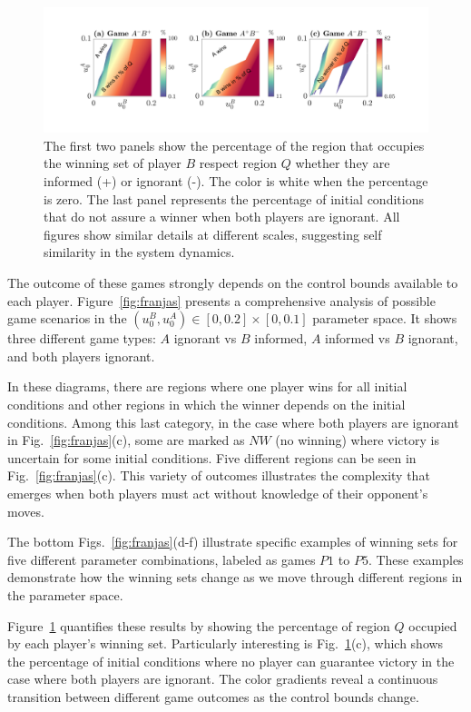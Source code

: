 \begin{figure}
    \centering
    \includegraphics[trim={3.1cm 0cm 0cm 0cm}, clip,width=1.12\textwidth  ]{Images/P5/fraccion.png}
    \caption{The first two panels show the percentage of the region that occupies the winning set of player $B$ respect region $Q$ whether they are informed (+) or ignorant (-). The color is white when the percentage is zero. The last panel represents the percentage of initial conditions that do not assure a winner when both players are ignorant. All figures show similar details at different scales, suggesting self similarity in the system dynamics.}
    \label{fig:fraccion}
\end{figure}

The outcome of these games strongly depends on the control bounds available to each player. Figure~\ref{fig:franjas} presents a comprehensive analysis of possible game scenarios in the $(u_0^B,u_0^A) \in [0,0.2]\times[0,0.1]$ parameter space. It shows three different game types: $A$ ignorant vs $B$ informed, $A$ informed vs $B$ ignorant, and both players ignorant.

In these diagrams, there are regions where one player wins for all initial conditions and other regions in which the winner depends on the initial conditions. Among this last category, in the case where both players are ignorant in Fig.~\ref{fig:franjas}(c), some are marked as $NW$ (no winning) where victory is uncertain for some initial conditions. Five different regions can be seen in Fig.~\ref{fig:franjas}(c). This variety of outcomes illustrates the complexity that emerges when both players must act without knowledge of their opponent's moves.

The bottom Figs.~\ref{fig:franjas}(d-f) illustrate specific examples of winning sets for five different parameter combinations, labeled as games $P1$ to $P5$. These examples demonstrate how the winning sets change as we move through different regions in the parameter space.

Figure~\ref{fig:fraccion} quantifies these results by showing the percentage of region $Q$ occupied by each player's winning set. Particularly interesting is Fig.~\ref{fig:fraccion}(c), which shows the percentage of initial conditions where no player can guarantee victory in the case where both players are ignorant. The color gradients reveal a continuous transition between different game outcomes as the control bounds change.

